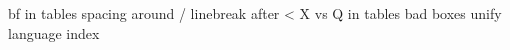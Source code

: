 bf in tables  
spacing around /
linebreak after <
X vs Q in tables
bad boxes
unify language index
    